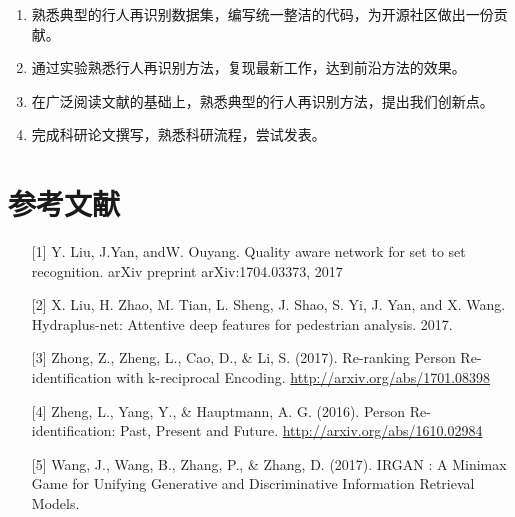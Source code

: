 \begin{enumerate}
	\item 熟悉典型的行人再识别数据集，编写统一整洁的代码，为开源社区做出一份贡献。
	\item 通过实验熟悉行人再识别方法，复现最新工作，达到前沿方法的效果。
    \item 在广泛阅读文献的基础上，熟悉典型的行人再识别方法，提出我们创新点。
    \item 完成科研论文撰写，熟悉科研流程，尝试发表。
\end{enumerate}

{
\section{参考文献}
}

\begin{itemize}
	\item [{[}1{]}] Y. Liu, J.Yan, andW. Ouyang. Quality aware network for set to set recognition. arXiv preprint arXiv:1704.03373, 2017
	\item [{[}2{]}] X. Liu, H. Zhao, M. Tian, L. Sheng, J. Shao, S. Yi, J. Yan, and X. Wang. Hydraplus-net: Attentive deep features for pedestrian analysis. 2017.
	\item [{[}3{]}] Zhong, Z., Zheng, L., Cao, D., \& Li, S. (2017). Re-ranking Person Re-identification with k-reciprocal Encoding. \url{http://arxiv.org/abs/1701.08398}
	\item [{[}4{]}] Zheng, L., Yang, Y., \& Hauptmann, A. G. (2016). Person Re-identification: Past, Present and Future. \url{http://arxiv.org/abs/1610.02984}
	\item [{[}5{]}] Wang, J., Wang, B., Zhang, P., \& Zhang, D. (2017). IRGAN : A Minimax Game for Unifying Generative and Discriminative Information Retrieval Models.
\end{itemize}


